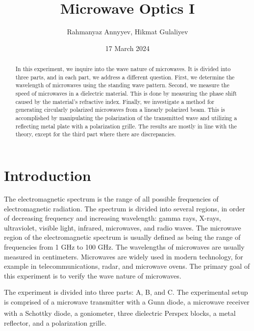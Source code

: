 \documentclass[10pt]{article}
\title{Microwave Optics I}
\author{Rahmanyaz Annyyev, Hikmat Gulaliyev}
\date{17 March 2024}
\begin{document}
\maketitle

\begin{abstract}
In this experiment, we inquire into the wave nature of microwaves. It is divided into three parts, and in each part, we address a different question. First, we determine the wavelength of microwaves using the standing wave pattern. Second, we measure the speed of microwaves in a dielectric material. This is done by measuring the phase shift caused by the material's refractive index. Finally, we investigate a method for generating circularly polarized microwaves from a linearly polarized beam. This is accomplished by manipulating the polarization of the transmitted wave and utilizing a reflecting metal plate with a polarization grille. The results are mostly in line with the theory, except for the third part where there are discrepancies.
\end{abstract}

\section{Introduction}

The electromagnetic spectrum is the range of all possible frequencies of electromagnetic radiation. The spectrum is divided into several regions, in order of decreasing frequency and increasing wavelength: gamma rays, X-rays, ultraviolet, visible light, infrared, microwaves, and radio waves. The microwave region of the electromagnetic spectrum is usually defined as being the range of frequencies from 1 GHz to 100 GHz. The wavelengths of microwaves are usually measured in centimeters. Microwaves are widely used in modern technology, for example in telecommunications, radar, and microwave ovens. The primary goal of this experiment is to verify the wave nature of microwaves.

The experiment is divided into three parts: A, B, and C. The experimental setup is comprised of a microwave transmitter with a Gunn diode, a microwave receiver with a Schottky diode, a goniometer, three dielectric Perspex\textsuperscript{\textregistered} blocks, a metal reflector, and a polarization grille.
\end{document}
